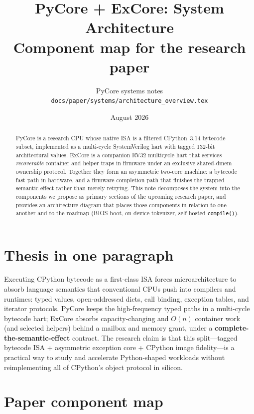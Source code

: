 \documentclass[11pt,a4paper]{article}
\title{PyCore + ExCore: System Architecture\\
\large Component map for the research paper}
\author{PyCore systems notes\\
\texttt{docs/paper/systems/architecture\_overview.tex}}
\date{August 2026}
\begin{document}
\maketitle

\begin{abstract}
PyCore is a research CPU whose native ISA is a filtered CPython~3.14 bytecode
subset, implemented as a multi-cycle SystemVerilog hart with tagged 132-bit
architectural values.
ExCore is a companion RV32 multicycle hart that services \emph{recoverable}
container and helper traps in firmware under an exclusive shared-dmem ownership
protocol.
Together they form an asymmetric two-core machine: a bytecode fast path in
hardware, and a firmware completion path that finishes the trapped semantic
effect rather than merely retrying.
This note decomposes the system into the components we propose as primary
sections of the upcoming research paper, and provides an architecture diagram
that places those components in relation to one another and to the roadmap
(BIOS boot, on-device tokenizer, self-hosted \texttt{compile()}).
\end{abstract}

\tableofcontents
\newpage

\section{Thesis in one paragraph}

Executing CPython bytecode as a first-class ISA forces microarchitecture to
absorb language semantics that conventional CPUs push into compilers and runtimes:
typed values, open-addressed dicts, call binding, exception tables, and
iterator protocols.
PyCore keeps the high-frequency typed paths in a multi-cycle bytecode hart;
ExCore absorbs capacity-changing and $O(n)$ container work (and selected helpers)
behind a mailbox and memory grant, under a \textbf{complete-the-semantic-effect}
contract.
The research claim is that this split---tagged bytecode ISA + asymmetric
exception core + CPython image fidelity---is a practical way to study and
accelerate Python-shaped workloads without reimplementing all of CPython's
object protocol in silicon.

\section{Paper component map}
\end{document}
